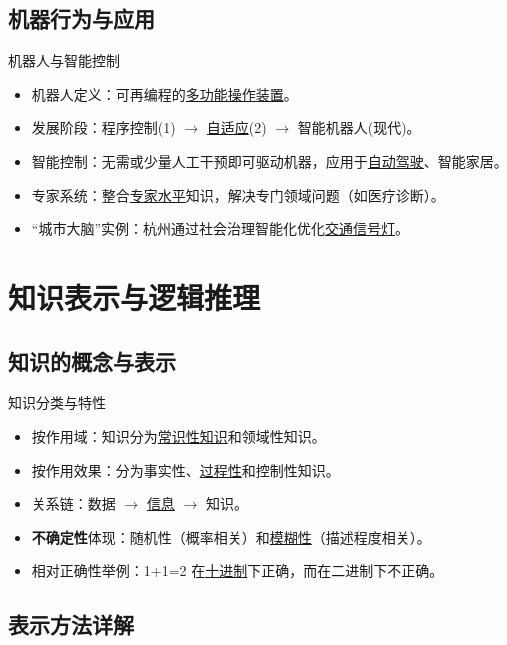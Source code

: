 \documentclass[11pt,a4paper]{ctexrep}
\newcommand{\fillblank}[1]{\underline{\hspace{2em}#1\hspace{2em}}}
\begin{document}
\section{机器行为与应用}
\begin{qbox}{机器人与智能控制}
    \begin{itemize}
        \item 机器人定义：可再编程的\fillblank{多功能操作装置}。
        \item 发展阶段：程序控制(1) $\to$ \fillblank{自适应}(2) $\to$ 智能机器人(现代)。
        \item 智能控制：无需或少量人工干预即可驱动机器，应用于\fillblank{自动驾驶}、智能家居。
        \item 专家系统：整合\fillblank{专家水平}知识，解决专门领域问题（如医疗诊断）。
        \item “城市大脑”实例：杭州通过社会治理智能化优化\fillblank{交通信号灯}。
    \end{itemize}
\end{qbox}

\chapter{知识表示与逻辑推理}

\section{知识的概念与表示}

\begin{qbox}{知识分类与特性}
    \begin{itemize}
        \item 按作用域：知识分为\fillblank{常识性知识}和领域性知识。
        \item 按作用效果：分为事实性、\fillblank{过程性}和控制性知识。
        \item 关系链：数据 $\to$ \fillblank{信息} $\to$ 知识。
        \item \textbf{不确定性}体现：随机性（概率相关）和\fillblank{模糊性}（描述程度相关）。
        \item 相对正确性举例：1+1=2 在\fillblank{十进制}下正确，而在二进制下不正确。
    \end{itemize}
\end{qbox}

\section{表示方法详解}
\end{document}
